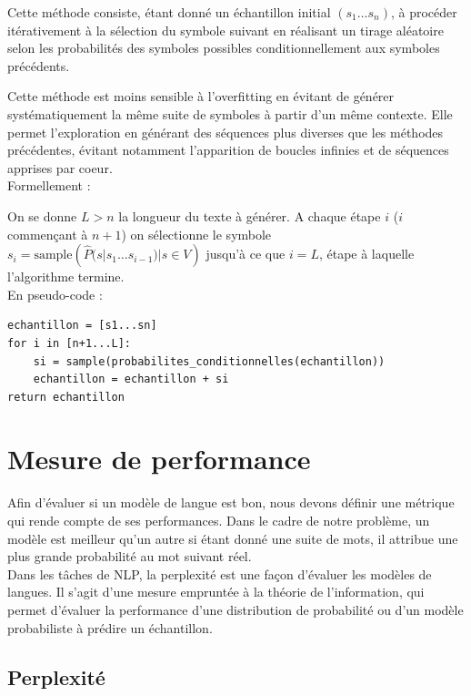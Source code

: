Cette méthode consiste, étant donné un échantillon initial $(s_1\ldots s_n)$, à procéder itérativement à la sélection du symbole suivant en réalisant un tirage aléatoire selon les probabilités des symboles possibles conditionnellement aux symboles précédents.

Cette méthode est moins sensible à l'overfitting en évitant de générer systématiquement la même suite de symboles à partir d'un même contexte. Elle permet l'exploration en générant des séquences plus diverses que les méthodes précédentes, évitant notamment l'apparition de boucles infinies et de séquences apprises par coeur. \\

Formellement :

On se donne $L>n$ la longueur du texte à générer.
A chaque étape $i$ ($i$ commençant à $n+1$) on sélectionne le symbole $s_i = \text{sample}({\widehat{P}(s|s_1\ldots s_{i-1}) | s \in V})$ jusqu'à ce que $i=L$, étape à laquelle l'algorithme termine. \\

En pseudo-code :

\begin{verbatim}
echantillon = [s1...sn]
for i in [n+1...L]:
    si = sample(probabilites_conditionnelles(echantillon))
    echantillon = echantillon + si
return echantillon
\end{verbatim}

\section{Mesure de performance}

Afin d’évaluer si un modèle de langue est bon, nous devons définir une métrique qui rende
compte de ses performances.
Dans le cadre de notre problème, un modèle est meilleur qu’un autre si étant donné une
suite de mots, il attribue une plus grande probabilité au mot suivant réel.  \\

Dans les tâches de NLP, la \og perplexité \fg{} est une façon d’évaluer les modèles de langues.
Il s'agit d'une mesure empruntée à la théorie de l'information, qui permet d'évaluer la
performance d'une distribution de probabilité ou d'un modèle probabiliste à prédire un échantillon.

\subsection{Perplexité}


